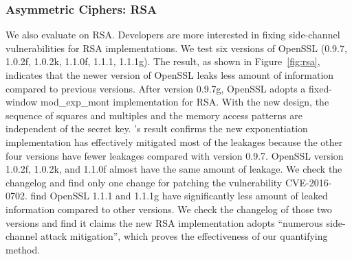 \subsubsection{Asymmetric Ciphers: RSA}\label{eval:asym}
We also evaluate \tool{} on RSA.  Developers are more interested in 
fixing side-channel vulnerabilities for RSA implementations. 
We test six versions of OpenSSL (0.9.7, 1.0.2f, 1.0.2k, 1.1.0f, 1.1.1, 1.1.1g). The
result, as shown in Figure~\ref{fig:rsa}, indicates that the newer
version of OpenSSL leaks less amount of information compared to previous
versions. After version 0.9.7g, OpenSSL adopts a fixed-window \textsf{mod\_exp\_mont}
implementation for RSA\@. With the new design, the sequence of squares and
multiples and the memory access patterns are independent of the secret key.
\tool{}'s result confirms the new exponentiation implementation has 
effectively mitigated most of the leakages because the other four versions have fewer
leakages compared with version 0.9.7. 
OpenSSL version 1.0.2f, 1.0.2k, and 1.1.0f almost have the
same amount of leakage. We check the changelog and find only one change for
patching the vulnerability CVE-2016-0702. 
\tool{} find OpenSSL 1.1.1 and 1.1.1g have significantly less amount of 
leaked information compared to other versions.
We check the changelog of those two versions and find it claims
the new RSA implementation adopts ``numerous side-channel attack mitigation'', 
which proves the effectiveness of our quantifying method.

